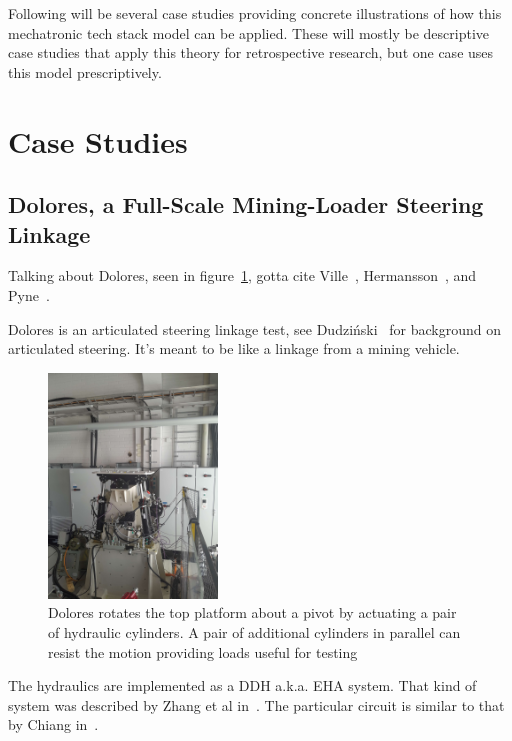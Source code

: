 \documentclass[english,12pt,a4paper,pdftex,eng,utf8]{aaltothesis}
\begin{document}
Following will be several case studies providing concrete illustrations of how this mechatronic tech stack model can be applied.  These will mostly be descriptive case studies that apply this theory for retrospective research, but one case uses this model prescriptively.

\clearpage

\section{Case Studies}\label{sec:case_studies}

\lipsum[1-3]

\subsection{Dolores, a Full-Scale Mining-Loader Steering Linkage}

Talking about Dolores, seen in figure~\ref{fig:dolores}, gotta cite Ville~\cite{Naervaenen2022}, Hermansson~\cite{Hermansson2021}, and Pyne~\cite{Pyne2020}.

Dolores is an articulated steering linkage test, see Dudziński~\cite{Dudzinski1989} for background on articulated steering.  It's meant to be like a linkage from a mining vehicle.

\begin{figure}[h]
	\centering
	\includegraphics[width=0.4\textwidth]{assets/dolores}
	\caption{Dolores rotates the top platform about a pivot by actuating a pair of hydraulic cylinders.  A pair of additional cylinders in parallel can resist the motion providing loads useful for testing}\label{fig:dolores}
\end{figure}

The hydraulics are implemented as a DDH a.k.a. EHA system.  That kind of system was described by Zhang et al in~\cite{Zhang2017}.  The particular circuit is similar to that by Chiang in~\cite{Chiang2011}.
\end{document}
